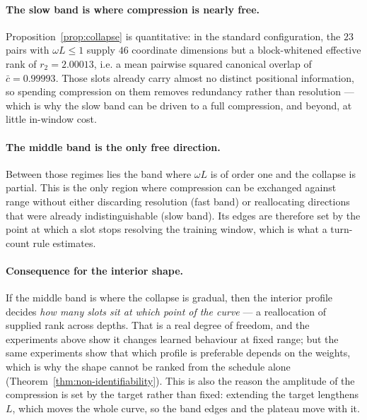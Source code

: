 \paragraph{The slow band is where compression is nearly free.} Proposition~\ref{prop:collapse}
is quantitative: in the standard configuration, the $23$ pairs with $\omega L\le1$
supply $46$ coordinate dimensions but a block-whitened effective rank of
$r_2=2.00013$, i.e. a mean pairwise squared canonical overlap of $\bar c=0.99993$.
Those slots already carry almost no distinct positional information, so spending
compression on them removes redundancy rather than resolution --- which is why the
slow band can be driven to a full compression, and beyond, at little in-window cost.

\paragraph{The middle band is the only free direction.} Between those regimes lies the
band where $\omega L$ is of order one and the collapse is partial. This is the only
region where compression can be exchanged against range without either discarding
resolution (fast band) or reallocating directions that were already indistinguishable
(slow band). Its edges are therefore set by the point at which a slot stops resolving
the training window, which is what a turn-count rule estimates.

\paragraph{Consequence for the interior shape.} If the middle band is where the
collapse is gradual, then the interior profile decides \emph{how many slots sit at
which point of the curve} --- a reallocation of supplied rank across depths. That is a
real degree of freedom, and the experiments above show it changes learned behaviour at
fixed range; but the same experiments show that which profile is preferable depends on
the weights, which is why the shape cannot be ranked from the schedule alone
(Theorem~\ref{thm:non-identifiability}). This is also the reason the amplitude of the
compression is set by the target rather than fixed: extending the target lengthens $L$,
which moves the whole curve, so the band edges and the plateau move with it.

